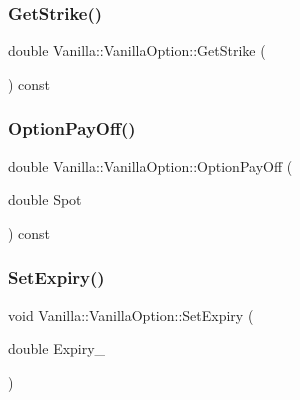 \subsubsection{\texorpdfstring{Get\+Strike()}{GetStrike()}}
{\footnotesize\ttfamily double Vanilla\+::\+Vanilla\+Option\+::\+Get\+Strike (\begin{DoxyParamCaption}{ }\end{DoxyParamCaption}) const}

\hypertarget{classVanilla_1_1VanillaOption_a5ad16d96edf31d179fab561ae87adb4a}{}\label{classVanilla_1_1VanillaOption_a5ad16d96edf31d179fab561ae87adb4a} 
\subsubsection{\texorpdfstring{Option\+Pay\+Off()}{OptionPayOff()}}
{\footnotesize\ttfamily double Vanilla\+::\+Vanilla\+Option\+::\+Option\+Pay\+Off (\begin{DoxyParamCaption}\item[{double}]{Spot }\end{DoxyParamCaption}) const}

\hypertarget{classVanilla_1_1VanillaOption_a6a7940405fa36f38a0f10573433b82bb}{}\label{classVanilla_1_1VanillaOption_a6a7940405fa36f38a0f10573433b82bb} 
\subsubsection{\texorpdfstring{Set\+Expiry()}{SetExpiry()}}
{\footnotesize\ttfamily void Vanilla\+::\+Vanilla\+Option\+::\+Set\+Expiry (\begin{DoxyParamCaption}\item[{double}]{Expiry\+\_\+ }\end{DoxyParamCaption})}

\hypertarget{classVanilla_1_1VanillaOption_a57f58eb1c19bb0940d2f56e85b76e8e6}{}\label{classVanilla_1_1VanillaOption_a57f58eb1c19bb0940d2f56e85b76e8e6} 
